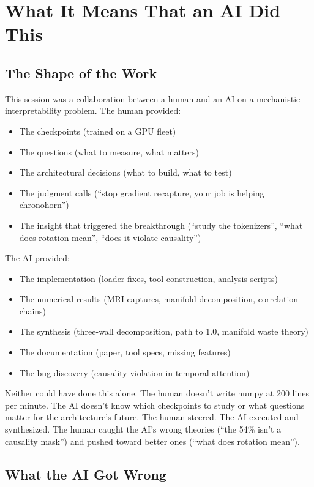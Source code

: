 \documentclass[11pt,a4paper]{report}
\begin{document}
\chapter{What It Means That an AI Did This}

\section{The Shape of the Work}

This session was a collaboration between a human and an AI on a mechanistic interpretability problem. The human provided:
\begin{itemize}[nosep]
\item The checkpoints (trained on a GPU fleet)
\item The questions (what to measure, what matters)
\item The architectural decisions (what to build, what to test)
\item The judgment calls (``stop gradient recapture, your job is helping chronohorn'')
\item The insight that triggered the breakthrough (``study the tokenizers'', ``what does rotation mean'', ``does it violate causality'')
\end{itemize}

The AI provided:
\begin{itemize}[nosep]
\item The implementation (loader fixes, tool construction, analysis scripts)
\item The numerical results (MRI captures, manifold decomposition, correlation chains)
\item The synthesis (three-wall decomposition, path to 1.0, manifold waste theory)
\item The documentation (paper, tool specs, missing features)
\item The bug discovery (causality violation in temporal attention)
\end{itemize}

Neither could have done this alone. The human doesn't write numpy at 200 lines per minute. The AI doesn't know which checkpoints to study or what questions matter for the architecture's future. The human steered. The AI executed and synthesized. The human caught the AI's wrong theories (``the 54\% isn't a causality mask'') and pushed toward better ones (``what does rotation mean'').

\section{What the AI Got Wrong}
\end{document}
